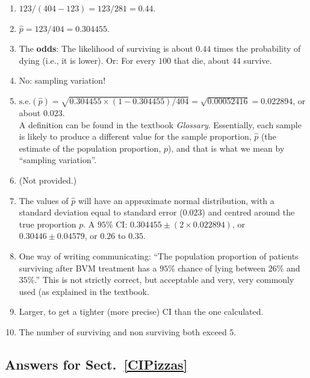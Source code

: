 \documentclass[
  11pt,
  a4paper,
  krantz2]{krantz}
\providecommand{\tightlist}{%
  \setlength{\itemsep}{0pt}\setlength{\parskip}{0pt}}
\begin{document}
\begin{footnotesize}
\begin{enumerate}
\def\labelenumi{\arabic{enumi}.}
\tightlist
\item
  \(123/(404 - 123) = 123/281 = 0.44\).\tightlist
\item
  \(\hat{p} = 123/404 = 0.304455\).
\item
  The \textbf{odds}: The likelihood of surviving is about \(0.44\) times the probability of dying (i.e., it is lower).
  Or: For every \(100\) that die, about \(44\) survive.
\item
  No: sampling variation!
\item
  \(\text{s.e.}(\hat{p}) = \sqrt{0.304455 \times (1 - 0.304455)/404} = \sqrt{0.00052416} = 0.022894\), or about \(0.023\).\\
  A definition can be found in the textbook \emph{Glossary}.
  Essentially, each sample is likely to produce a different value for the sample proportion, \(\hat{p}\) (the estimate of the population proportion, \(p\)), and that is what we mean by ``sampling variation''.
\item
  (Not provided.)
\item
  The values of \(\hat{p}\) will have an approximate normal distribution, with a standard deviation equal to standard error (\(0.023\)) and centred around the true proportion \(p\).
  A \(95\)\% CI: \(0.304455 \pm (2\times0.022894)\), or \(0.30446\pm0.04579\), or \(0.26\) to \(0.35\).
\item
  One way of writing communicating: ``The population proportion of patients surviving after BVM treatment has a \(95\)\% chance of lying between \(26\)\% and \(35\)\%.''
  This is not strictly correct, but acceptable and very, very commonly used (as explained in the textbook.
\item
  Larger, to get a tighter (more precise) CI than the one calculated.
\item
  The number of surviving and non surviving both exceed \(5\).
\end{enumerate}

\subsection*{Answers for Sect.~\ref{CIPizzas}}\label{answers-for-sect.-refcipizzas}


\end{footnotesize}
\end{document}
